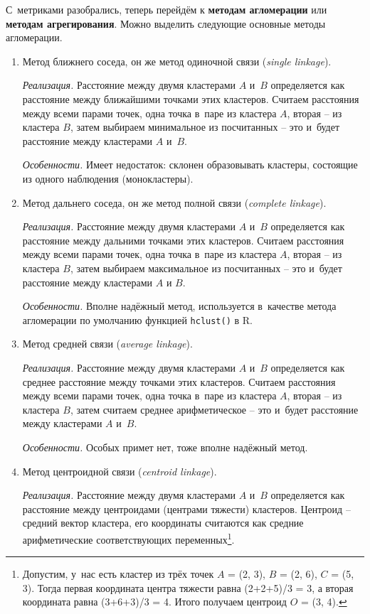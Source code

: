 \documentclass[12pt,a4paper]{article}
\theoremstyle{definition}
\begin{document}
С~метриками разобрались, теперь перейдём к \textbf{методам агломерации} или \textbf{методам агрегирования}. 
Можно выделить следующие основные методы агломерации.

\begin{enumerate}
\item Метод ближнего соседа, он же метод одиночной связи (\textit{single linkage}).

\textit{Реализация.} Расстояние между двумя кластерами $A$ и~$B$ определяется как расстояние между 
ближайшими точками этих кластеров. Считаем расстояния между всеми парами точек, одна точка 
в~паре из кластера $A$, вторая – из кластера $B$, затем выбираем минимальное из 
посчитанных – это и~будет расстояние между кластерами $A$ и~$B$. 

\textit{Особенности.} Имеет недостаток: склонен образовывать кластеры, состоящие из одного 
наблюдения (монокластеры).
\item Метод дальнего соседа, он же метод полной связи (\textit{complete linkage}).

\textit{Реализация.} Расстояние между двумя кластерами $A$ и~$B$ определяется как расстояние между 
дальними точками этих кластеров. Считаем расстояния между всеми парами точек, одна точка 
в~паре из кластера $A$, вторая – из кластера $B$, затем выбираем максимальное из 
посчитанных – это и~будет расстояние между кластерами $A$ и $B$.

\textit{Особенности.} Вполне надёжный метод, используется в~качестве метода 
агломерации по умолчанию функцией \texttt{hclust()} в R.
\item Метод средней связи (\textit{average linkage}). 

\textit{Реализация.} Расстояние между двумя кластерами $A$ и~$B$ определяется как среднее расстояние между 
точками этих кластеров. Считаем расстояния между всеми парами точек, одна точка 
в~паре из кластера $A$, вторая – из кластера $B$, затем считаем среднее арифметическое – это и~будет 
расстояние между кластерами $A$ и~$B$.

\textit{Особенности.}  Особых примет нет, тоже вполне надёжный метод.
\item Метод центроидной связи (\textit{centroid linkage}).

\textit{Реализация.} Расстояние между двумя кластерами $A$ и~$B$ определяется как расстояние между 
центроидами (центрами тяжести) кластеров. Центроид – средний вектор кластера, его координаты считаются 
как средние арифметические соответствующих 
переменных\footnote{Допустим, у~нас есть кластер из трёх точек $A$ = (2, 3), $B$ = (2, 6), 
$C$ = (5, 3). Тогда первая координата центра тяжести равна (2+2+5)/3 = 3, а 
вторая координата равна (3+6+3)/3 = 4. Итого получаем центроид $O$ = (3, 4).}.


\end{enumerate}
\end{document}
